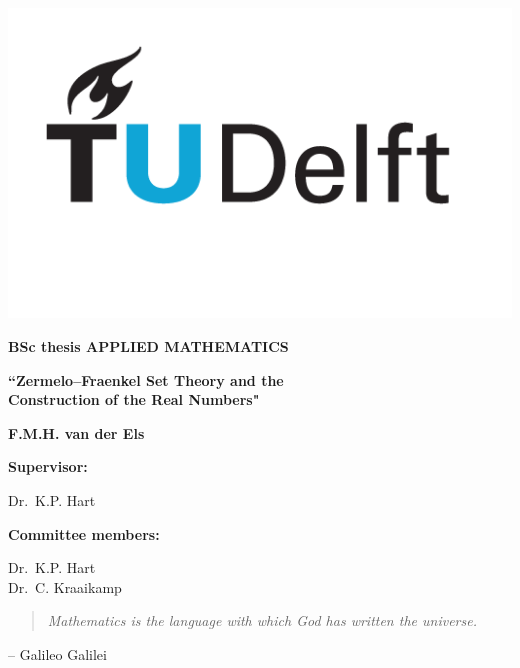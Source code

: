 \documentclass[10pt, a4paper]{report}
\theoremstyle{definition}
\begin{document}
\begin{titlepage}
    \null
\end{titlepage}
\newpage

\begin{titlepage}
    \begin{flushright}
        \includegraphics[width=.5\linewidth]{figures/tudelft.png}
    \end{flushright}
    \begin{center}
        {\large\bfseries BSc thesis APPLIED MATHEMATICS}

        \vspace*{3em}

        {\large\bfseries ``Zermelo–Fraenkel Set Theory and the \\ Construction of the Real Numbers"}

        \vspace*{3em}

        {\large\bfseries F.M.H. van der Els}
    \end{center}

    \vspace*{15em}

    \begin{flushleft}
        {\large\bfseries Supervisor:}

        \vspace*{1em}

        {\large Dr.\ K.P. Hart}

        \vspace*{3em}

        {\large\bfseries Committee members:}

        \vspace*{1em}

        {\large Dr.\ K.P. Hart \\[1em] Dr.\ C. Kraaikamp}
    \end{flushleft}
\end{titlepage}
\newpage

\begin{titlepage}
    \begin{quote}
        \textit{Mathematics is the language with which God has written the universe.}
    \end{quote}
    \begin{flushright}
         -- Galileo Galilei
    \end{flushright}
\end{titlepage}
\newpage
\end{document}
